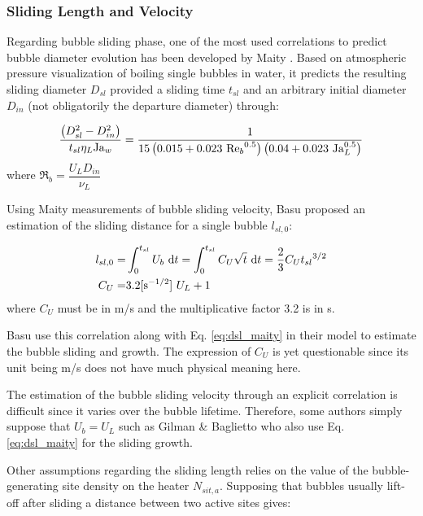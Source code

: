 \subsubsection{Sliding Length and Velocity}

Regarding bubble sliding phase, one of the most used correlations to predict bubble diameter evolution has been developed by Maity \cite{maity_effect_2000}. Based on atmospheric pressure visualization of boiling single bubbles in water, it predicts the resulting sliding diameter $D_{sl}$ provided a sliding time $t_{sl}$ and an arbitrary initial diameter $D_{in}$ (not obligatorily the departure diameter) through:

\begin{equation}
\frac{\left( D_{sl}^{2} - D_{in}^{2} \right) }{t_{sl} \eta_{L} \mathrm{Ja}_{w}} = \frac{1}{15\left( 0.015+0.023\ {\mathrm{Re}_{b}}^{0.5}  \right) \left( 0.04+0.023\ \mathrm{Ja}_{L}^{0.5} \right) }
\label{eq:dsl_maity}
\end{equation}
where $\Re_{b}=\dfrac{U_{L}D_{in}}{\nu_{L}}$


Using Maity measurements of bubble sliding velocity, Basu \etal proposed an estimation of the sliding distance for a single bubble $l_{sl,0}$:

\begin{align}
l_{sl,0}=& \int_{0}^{t_{sl}} U_{b}\ \mathrm{d}t = \int_{0}^{t_{sl}}C_{U} \sqrt{t}\ \mathrm{d}t =  \frac{2}{3}C_{U}{t_{sl}}^{3/2}
\label{eq:lsl_basu}\\
%
C_{U} =& 3.2[\text{s\up{-1/2}}]\ U_{L}+1
\end{align}
where $C_{U}$ must be in m/s and the multiplicative factor 3.2 is in s.

\begin{remark*}{}
Basu \etal use this correlation along with Eq. \ref{eq:dsl_maity} in their model to estimate the bubble sliding and growth. The expression of $C_{U}$ is yet questionable since its unit being m/s does not have much physical meaning here.

\npar

The estimation of the bubble sliding velocity through an explicit correlation is difficult since it varies over the bubble lifetime. Therefore, some authors simply suppose that $U_{b} = U_{L}$ such as Gilman \& Baglietto who also use Eq. \ref{eq:dsl_maity} for the sliding growth.
\end{remark*}


Other assumptions regarding the sliding length relies on the value of the bubble-generating site density on the heater $N_{sit,a}$. Supposing that bubbles usually lift-off after sliding a distance between two active sites gives:

